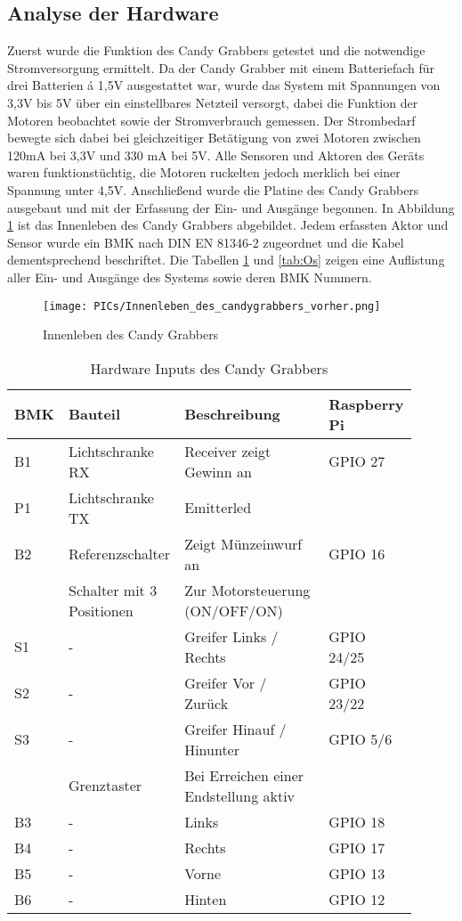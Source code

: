 \documentclass[BMR,Bachelor,ngerman]{twbook}%
\begin{document}
\subsection{Analyse der Hardware}
Zuerst wurde die Funktion des Candy Grabbers getestet und die notwendige Stromversorgung ermittelt. Da der Candy Grabber mit einem Batteriefach für drei Batterien á 1,5V ausgestattet war, wurde das System mit Spannungen von 3,3V bis 5V über ein einstellbares Netzteil versorgt, dabei die Funktion der Motoren beobachtet sowie der Stromverbrauch gemessen. Der Strombedarf bewegte sich dabei bei gleichzeitiger Betätigung von zwei Motoren zwischen 120mA bei 3,3V und 330 mA bei 5V. Alle Sensoren und Aktoren des Geräts waren funktionstüchtig, die Motoren ruckelten jedoch merklich bei einer Spannung unter 4,5V. Anschließend wurde die Platine des Candy Grabbers ausgebaut und mit der Erfassung der Ein- und Ausgänge begonnen. In Abbildung \ref{fig:cgopen} ist das Innenleben des Candy Grabbers abgebildet. Jedem erfassten Aktor und Sensor wurde ein \ac{BMK} nach DIN EN 81346-2 zugeordnet und die Kabel dementsprechend beschriftet. Die Tabellen \ref{tab:Is} und \ref{tab:Os} zeigen eine Auflistung aller Ein- und Ausgänge des Systems sowie deren BMK Nummern.
\begin{figure}[!htbp]
\centering
\texttt{[image: PICs/Innenleben\_des\_candygrabbers\_vorher.png]}
\caption{Innenleben des Candy Grabbers}\label{fig:cgopen}
\end{figure}
\begin{table}[H]
\centering
\caption{Hardware Inputs des Candy Grabbers}\label{tab:Is}
\begin{tabular}{| p{0.08\linewidth} | p{0.27\linewidth} | p{0.4\linewidth} | p{0.15\linewidth} |}\hline
\rowcolor[gray]{0.8} BMK & Bauteil & Beschreibung & Raspberry Pi\\\hline
B1 & Lichtschranke RX & Receiver zeigt Gewinn an & GPIO 27\\
P1 & Lichtschranke TX & Emitterled &  \\\hline
B2 & Referenzschalter & Zeigt Münzeinwurf an & GPIO 16\\\hline
 & Schalter mit 3 Positionen & Zur Motorsteuerung (ON/OFF/ON) &\\
S1 & - & Greifer Links / Rechts & GPIO 24/25 \\
S2 & - & Greifer Vor / Zurück & GPIO 23/22\\
S3 & - & Greifer Hinauf / Hinunter & GPIO 5/6\\\hline
 & Grenztaster & Bei Erreichen einer Endstellung aktiv&\\
B3 & - &  Links & GPIO 18\\
B4 & - &  Rechts & GPIO 17 \\
B5 & - &  Vorne& GPIO 13\\
B6 & - &  Hinten& GPIO 12\\\hline
\end{tabular}
\end{table}
\end{document}
